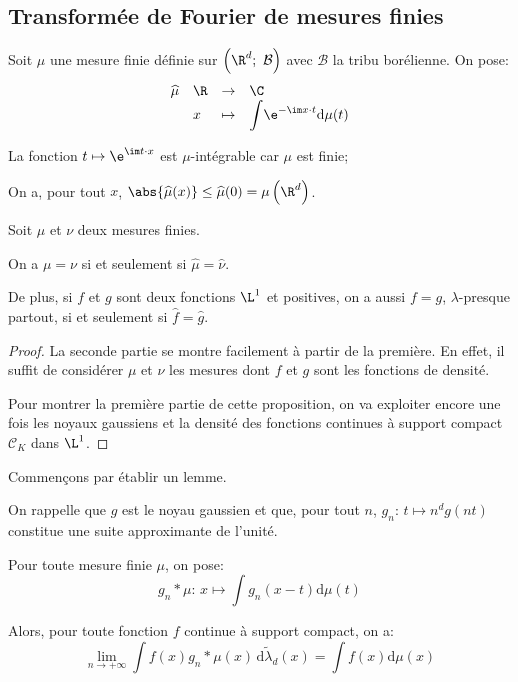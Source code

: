 \subsection{Transformée de Fourier de mesures finies}


\begin{de}
Soit $\mu$ une mesure finie définie sur $\left ( \R^d;~\mathcal{B}\right )$ avec $\mathcal{B}$ la tribu borélienne. On pose:
\[
\begin{array}{llcl}
\widehat{\mu} & \R & \to & \C \\
 & x & \mapsto & \displaystyle{\int} \e^{- \im x \cdot t} \mathrm d \mu(t)
\end{array}
\]
\end{de}

\begin{listremarques}
\item
La fonction $t \mapsto \e^{\im t \cdot x}$ est $\mu$-intégrable car $\mu$ est finie;
\item
On a, pour tout $x$, $\abs{\widehat{\mu}(x)} \leq \widehat{\mu}(0) = \mu\left ( \R^d\right )$.
\end{listremarques}


\begin{theo}
\label{injectivite_Fourier}
Soit $\mu$ et $\nu$ deux mesures finies. 

\medskip
On a $\mu = \nu$ si et seulement si $\widehat{\mu} = \widehat{\nu}$.

\medskip
De plus, si $f$ et $g$ sont deux fonctions $\L^1$ et positives, on a aussi $f = g$, $\lambda$-presque partout, si et seulement si $\widehat{f} = \widehat{g}$.
\end{theo}

\begin{proof}
La seconde partie se montre facilement à partir de la première. En effet, il suffit de considérer $\mu$ et $\nu$ les mesures dont $f$ et $g$ sont les fonctions de densité.

\medskip
Pour montrer la première partie de cette proposition, on va exploiter encore une fois les noyaux gaussiens et la densité des fonctions continues à support compact $\mathcal{C}_K$ dans $\L^1$.
\end{proof}


Commençons par établir un lemme.

\begin{lem}
On rappelle que $g$ est le noyau gaussien et que, pour tout $n$, $g_n: \, t \mapsto n^d g(nt)$ constitue une suite approximante de l'unité.

\medskip
Pour toute mesure finie $\mu$, on pose:
\[
g_n * \mu: \, x \mapsto \displaystyle{\int} g_n(x-t) \mathrm d \mu(t) 
\]


\medskip
Alors, pour toute fonction $f$ continue à support compact, on a:
\[
\lim \limits_{n \to +\infty} \displaystyle{\int} f(x) g_n * \mu (x) \, \mathrm d \tilde{\lambda}_d(x) = \displaystyle{\int} f(x) \mathrm d \mu(x)
\]
\end{lem}

